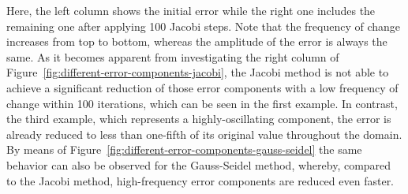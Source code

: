 Here, the left column shows the initial error while the right one includes the remaining one after applying 100 Jacobi steps.
Note that the frequency of change increases from top to bottom, whereas the amplitude of the error is always the same.
As it becomes apparent from investigating the right column of Figure~\ref{fig:different-error-components-jacobi}, the Jacobi method is not able to achieve a significant reduction of those error components with a low frequency of change within 100 iterations, which can be seen in the first example.
In contrast, the third example, which represents a highly-oscillating component, the error is already reduced to less than one-fifth of its original value throughout the domain.
By means of Figure~\ref{fig:different-error-components-gauss-seidel} the same behavior can also be observed for the Gauss-Seidel method, whereby, compared to the Jacobi method, high-frequency error components are reduced even faster.
